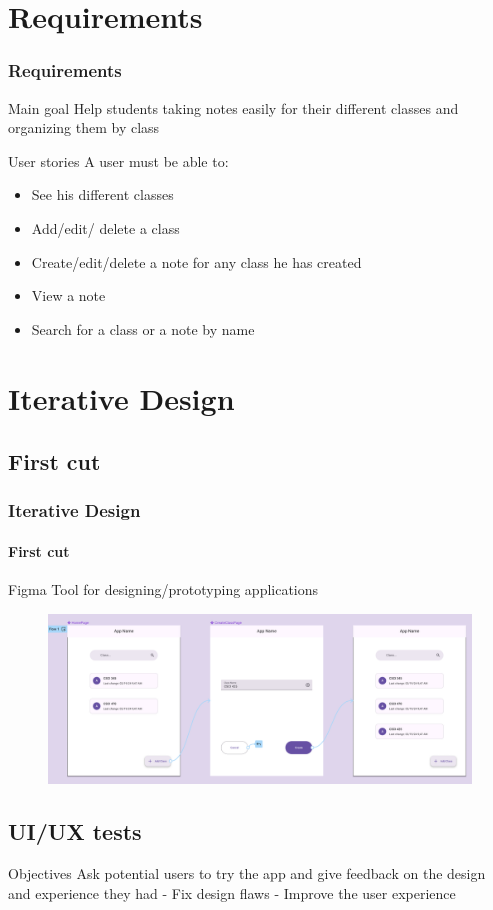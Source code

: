 \documentclass{beamer}
\begin{document}
	\section{Requirements}
	\begin{frame}
		\frametitle{Requirements}
		
		\begin{alertblock}{Main goal}
			Help students taking notes easily for their different classes and organizing them by class
		\end{alertblock}
		
		\begin{alertblock}{User stories}
			A user must be able to:
			\begin{itemize}
				\item See his different classes
				\item Add/edit/ delete a class
				\item Create/edit/delete a note for any class he has created
				\item View a note
				\item  Search for a class or a note by name
			\end{itemize}
		\end{alertblock}
	\end{frame}
	
	\section{Iterative Design}
	\subsection{First cut}
	\begin{frame}
		\frametitle{Iterative Design}
		\framesubtitle{First cut}
		
		\begin{alertblock}{Figma}
			Tool for designing/prototyping applications
		\end{alertblock}
		
		\begin{figure}
			\centering
			\begin{minipage}{1\textwidth}
				\includegraphics[width=\linewidth]{figma_user_story_create_class}
			\end{minipage}
		\end{figure}
	\end{frame}
	
	\subsection{UI/UX tests}
	\begin{alertblock}{Objectives}
		Ask potential users to try the app and give feedback on the design and experience they had
		\linebreak
		- Fix design flaws
		\linebreak
		- Improve the user experience
	\end{alertblock}
\end{document}
